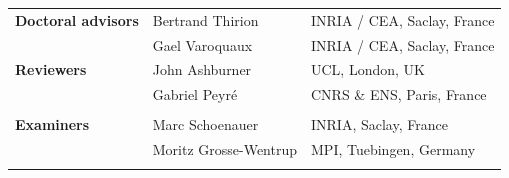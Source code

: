\documentclass[nobib, a4paper, notoc, twoside, justified, openany]{tufte-book}
\begin{document}
\begin{titlepage}
\begin{fullwidth}
\begin{center}
{\LARGE
\begin{tabular}{lll}
\vspace{1pc}
\textbf{Doctoral advisors} & Bertrand Thirion & INRIA / CEA, Saclay, France \\
\vspace{1pc}
 & Gael Varoquaux & INRIA / CEA, Saclay, France \\
\vspace{1pc}
  \textbf{Reviewers} & John Ashburner  & UCL, London, UK  \\
  \vspace{1pc}  
& Gabriel Peyr\'e  & CNRS \& ENS, Paris, France  \\  \\
  \vspace{1pc}
\textbf{Examiners} & Marc Schoenauer & INRIA,  Saclay, France \\
  \vspace{1pc}
 & Moritz Grosse-Wentrup  & MPI, Tuebingen, Germany \\  
\vspace{1pc}
\end{tabular}
}


\end{center}
\end{fullwidth}
\end{titlepage}
\end{document}
